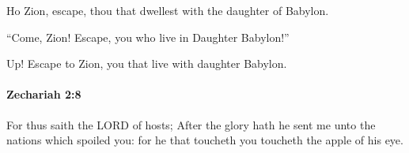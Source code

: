 			\begin{versebox}
					\item[BHS] 
					\item[LXX] 
					\item[ASV] Ho Zion, escape, thou that dwellest with the daughter of Babylon.
					\item[NIV] “Come, Zion! Escape, you who live in Daughter Babylon!”
					\item[NRSV] Up! Escape to Zion, you that live with daughter Babylon.
			\end{versebox}

		\paragraph{Zechariah 2:8} %
			\label{ZECHARIAH-2-8}

			For thus saith the LORD of hosts; After the glory hath he sent me unto the nations which spoiled you: for he that toucheth you toucheth the apple of his eye.

